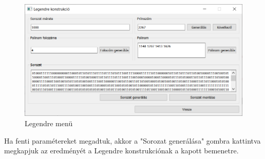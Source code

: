 \documentclass[hidelinks, 12pt]{article}
\begin{document}
	\begin{figure}[h]
		\centering
		\begin{minipage}{\textwidth} %
			\includegraphics[width=\textwidth]{legendremenu.png}
		\end{minipage}
		\caption{Legendre menü}
	\end{figure}
	Ha fenti paramétereket megadtuk, akkor a "Sorozat generálása" gombra kattintva megkapjuk az eredményét a Legendre konstrukciónak a kapott bemenetre.
\end{document}
